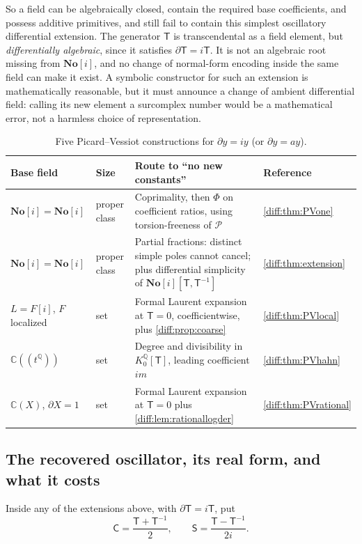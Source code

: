 \documentclass[11pt,letterpaper]{article}
\numberwithin{equation}{section}
\theoremstyle{definition}
\theoremstyle{remark}
\newcommand{\No}{\mathbf{No}}
\newcommand{\SC}{\mathbf{No}[i]}
\newcommand{\C}{\mathbb C}
\newcommand{\Q}{\mathbb Q}
\newcommand{\der}{\partial}
\newcommand{\Pcl}{\mathcal P}
\begin{document}
So a field can be algebraically closed, contain the required base
coefficients, and possess additive primitives, and still fail to contain this
simplest oscillatory differential extension. The generator $\mathsf T$ is
transcendental as a field element, but \emph{differentially algebraic}, since
it satisfies $\der\mathsf T=i\mathsf T$. It is not an algebraic root
missing from $\No[i]$, and no change of normal-form encoding inside the same
field can make it exist. A symbolic constructor for such an extension is mathematically
reasonable, but it must announce a change of ambient differential field:
calling its new element a surcomplex number would be a mathematical error, not
a harmless choice of representation.

\begin{table}[htbp]
\centering\small
\caption{Five Picard--Vessiot constructions for $\der y=iy$ (or $\der y=ay$).}
\label{diff:tab:PV}
\begin{tabularx}{\textwidth}{@{}L{0.21\textwidth}L{0.15\textwidth}YL{0.13\textwidth}@{}}
\toprule
Base field & Size & Route to ``no new constants'' & Reference \\
\midrule
$\SC=\No[i]$ &
proper class &
Coprimality, then $\Phi$ on coefficient ratios, using torsion-freeness of
$\Pcl$ &
\cref{diff:thm:PVone} \\
$\SC=\No[i]$ &
proper class &
Partial fractions: distinct simple poles cannot cancel; plus differential
simplicity of $\SC[\mathsf T,\mathsf T^{-1}]$ &
\cref{diff:thm:extension} \\
$L=F[i]$, $F$ localized &
set &
Formal Laurent expansion at $\mathsf T=0$, coefficientwise, plus
\cref{diff:prop:coarse} &
\cref{diff:thm:PVlocal} \\
$\C((t^{\Q}))$ &
set &
Degree and divisibility in $K_{0}^{\Q}[\mathsf T]$, leading coefficient $im$ &
\cref{diff:thm:PVhahn} \\
$\C(X)$, $\der X=1$ &
set &
Formal Laurent expansion at $\mathsf T=0$ plus
\cref{diff:lem:rationallogder} &
\cref{diff:thm:PVrational} \\
\bottomrule
\end{tabularx}
\end{table}

\subsection{The recovered oscillator, its real form, and what it costs}
\label{diff:sub:realform}

Inside any of the extensions above, with $\der\mathsf T=i\mathsf T$, put
\begin{equation}\label{diff:eq:csU}
 \mathsf C=\frac{\mathsf T+\mathsf T^{-1}}{2},\qquad
 \mathsf S=\frac{\mathsf T-\mathsf T^{-1}}{2i}.
\end{equation}
\end{document}
